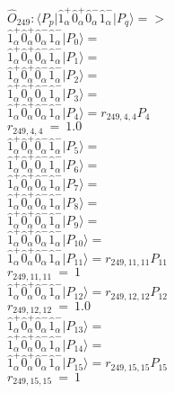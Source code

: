 \documentclass[14pt]{article}
\begin{document}
    $\hat{O}_{249}:  \langle{P_p}\vert \hat{1}_{\alpha}^{+}\hat{0}_{\alpha}^{+}\hat{0}_{\alpha}^{-}\hat{1}_{\alpha}^{-} \vert{P_q}\rangle => $ \\ 
    $ \hat{1}_{\alpha}^{+}\hat{0}_{\alpha}^{+}\hat{0}_{\alpha}^{-}\hat{1}_{\alpha}^{-} \vert{P_{0}}\rangle =  $ \\ 
    $ \hat{1}_{\alpha}^{+}\hat{0}_{\alpha}^{+}\hat{0}_{\alpha}^{-}\hat{1}_{\alpha}^{-} \vert{P_{1}}\rangle =  $ \\ 
    $ \hat{1}_{\alpha}^{+}\hat{0}_{\alpha}^{+}\hat{0}_{\alpha}^{-}\hat{1}_{\alpha}^{-} \vert{P_{2}}\rangle =  $ \\ 
    $ \hat{1}_{\alpha}^{+}\hat{0}_{\alpha}^{+}\hat{0}_{\alpha}^{-}\hat{1}_{\alpha}^{-} \vert{P_{3}}\rangle =  $ \\ 
    $ \hat{1}_{\alpha}^{+}\hat{0}_{\alpha}^{+}\hat{0}_{\alpha}^{-}\hat{1}_{\alpha}^{-} \vert{P_{4}}\rangle = {r}_{249,4,4}P_{4} $ \\ 
    ${r}_{249,4,4}\ =\ 1.0 $ \\ 
    $ \hat{1}_{\alpha}^{+}\hat{0}_{\alpha}^{+}\hat{0}_{\alpha}^{-}\hat{1}_{\alpha}^{-} \vert{P_{5}}\rangle =  $ \\ 
    $ \hat{1}_{\alpha}^{+}\hat{0}_{\alpha}^{+}\hat{0}_{\alpha}^{-}\hat{1}_{\alpha}^{-} \vert{P_{6}}\rangle =  $ \\ 
    $ \hat{1}_{\alpha}^{+}\hat{0}_{\alpha}^{+}\hat{0}_{\alpha}^{-}\hat{1}_{\alpha}^{-} \vert{P_{7}}\rangle =  $ \\ 
    $ \hat{1}_{\alpha}^{+}\hat{0}_{\alpha}^{+}\hat{0}_{\alpha}^{-}\hat{1}_{\alpha}^{-} \vert{P_{8}}\rangle =  $ \\ 
    $ \hat{1}_{\alpha}^{+}\hat{0}_{\alpha}^{+}\hat{0}_{\alpha}^{-}\hat{1}_{\alpha}^{-} \vert{P_{9}}\rangle =  $ \\ 
    $ \hat{1}_{\alpha}^{+}\hat{0}_{\alpha}^{+}\hat{0}_{\alpha}^{-}\hat{1}_{\alpha}^{-} \vert{P_{10}}\rangle =  $ \\ 
    $ \hat{1}_{\alpha}^{+}\hat{0}_{\alpha}^{+}\hat{0}_{\alpha}^{-}\hat{1}_{\alpha}^{-} \vert{P_{11}}\rangle = {r}_{249,11,11}P_{11} $ \\ 
    ${r}_{249,11,11}\ =\ 1 $ \\ 
    $ \hat{1}_{\alpha}^{+}\hat{0}_{\alpha}^{+}\hat{0}_{\alpha}^{-}\hat{1}_{\alpha}^{-} \vert{P_{12}}\rangle = {r}_{249,12,12}P_{12} $ \\ 
    ${r}_{249,12,12}\ =\ 1.0 $ \\ 
    $ \hat{1}_{\alpha}^{+}\hat{0}_{\alpha}^{+}\hat{0}_{\alpha}^{-}\hat{1}_{\alpha}^{-} \vert{P_{13}}\rangle =  $ \\ 
    $ \hat{1}_{\alpha}^{+}\hat{0}_{\alpha}^{+}\hat{0}_{\alpha}^{-}\hat{1}_{\alpha}^{-} \vert{P_{14}}\rangle =  $ \\ 
    $ \hat{1}_{\alpha}^{+}\hat{0}_{\alpha}^{+}\hat{0}_{\alpha}^{-}\hat{1}_{\alpha}^{-} \vert{P_{15}}\rangle = {r}_{249,15,15}P_{15} $ \\ 
    ${r}_{249,15,15}\ =\ 1 $ \\ 
    
\end{document}
